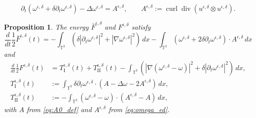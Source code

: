 \documentclass[10pt,a4paper]{amsart}
\newtheorem{proposition}{Proposition}
\DeclareMathOperator{\curl}{curl}
\DeclareMathOperator{\dive}{div}
\begin{document}
\begin{equation} \label{eq:omega_ed}
    \partial_t \left( \omega^{\epsilon,\delta} + \delta\partial_t\omega^{\epsilon,\delta} \right) - \Delta \omega^{\epsilon,\delta} =  A^{\epsilon,\delta}, \qquad A^{\epsilon,\delta}:= \curl\dive(u^{\epsilon,\delta}\otimes u^{\epsilon,\delta}).
\end{equation}

\begin{proposition}
The energy $\bar F^{\epsilon,\delta}$ and $F^{\epsilon,\delta}$ satisfy
\begin{equation} \label{eq:F0_evolve}
    \frac{d}{dt}\frac{1}{2}\bar F^{\epsilon,\delta}(t) = -\int_{\mathbb T^3} \left( \delta \left|\partial_t \omega^{\epsilon,\delta} \right|^2 + \left| \nabla\omega^{\epsilon,\delta} \right|^2 \right) \, dx -\int_{\mathbb T^3} \left( \omega^{\epsilon,\delta}+2\delta\partial_t \omega^{\epsilon,\delta} \right)\cdot A^{\epsilon,\delta} \, dx
\end{equation}
and
\begin{equation} \label{eq:modu_energy_evolve}
\begin{split}
    \frac{d}{dt}\frac{1}{2}F^{\epsilon,\delta}(t) &= T^{\epsilon,\delta}_\text{I}(t) + T^{\epsilon,\delta}_\text{II}(t) - \int_{\mathbb T^3}\left( \left| \nabla(\omega^{\epsilon,\delta}-\omega) \right|^2 + \delta \left| \partial_t\omega^{\epsilon,\delta} \right|^2 \right)\,dx, \\
    T^{\epsilon,\delta}_\text{I}(t) &:= \int_{\mathbb T^3} \delta\partial_t\omega^{\epsilon,\delta} \cdot\left(A-\Delta\omega-2A^{\epsilon,\delta} \right) \, dx, \\
    T^{\epsilon,\delta}_\text{II}(t) &:= - \int_{\mathbb T^3} (\omega^{\epsilon,\delta}-\omega)\cdot(A^{\epsilon,\delta}-A)\,dx,
\end{split}
\end{equation}
with  $A$ from \eqref{eq:A0_def} and $A^{\epsilon,\delta}$ from \eqref{eq:omega_ed}.
\end{proposition}
\end{document}
